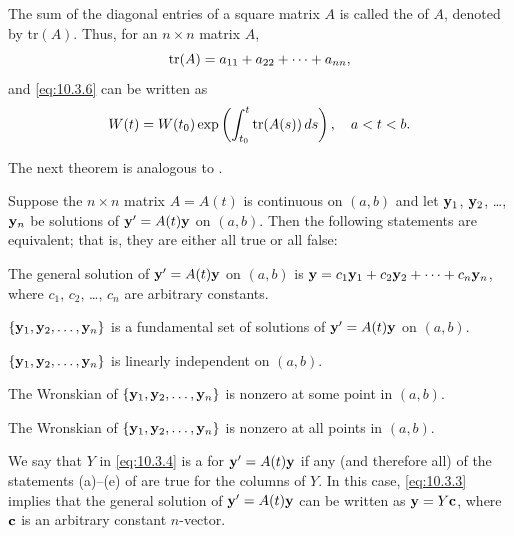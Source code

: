 \begin{remark*}
The sum of the diagonal entries of a square matrix $A$ is called the
 of $A$, denoted by tr$(A)$. Thus, for an $n\times n$
matrix $A$,
\[
\operatorname{tr}(A)=a_{11}+a_{22}+\cdots+a_{nn},
\]
and  \eqref{eq:10.3.6} can be written as
\[
W(t)=W(t_0)\exp\left(
\int^t_{t_0}\operatorname{tr}(A(s))\,
ds\right), \quad a < t < b.
\]
\end{remark*}

The next theorem is analogous to
.

\begin{theorem}\label{thmtype:10.3.3}
Suppose the  $n\times n$ matrix $A=A(t)$ is continuous
 on $(a,b)$ and let
$\mathbf{y}_1$, $\mathbf{y}_2$, \dots, $\mathbf{y}_n$
be  solutions of $\mathbf{y}'=A(t)\mathbf{y}$ on  $(a,b)$.
 Then the following statements are equivalent; that is, they are
either all true or all false:
\begin{alist}
\item %
The general
solution
of $\mathbf{y}'=A(t)\mathbf{y}$ on  $(a,b)$ is
$\mathbf{y}=c_1\mathbf{y}_1+c_2\mathbf{y}_2+\cdots+c_n\mathbf{y}_n$,
where $c_1$, $c_2$, \dots, $c_n$  are arbitrary constants.
\item %
$\{\mathbf{y}_1,\mathbf{y}_2,\dots,\mathbf{y}_n\}$ is a fundamental set of
solutions
of $\mathbf{y}'=A(t)\mathbf{y}$  on $(a,b)$.
\item %
 $\{\mathbf{y}_1,\mathbf{y}_2,\dots,\mathbf{y}_n\}$ is linearly
independent
on $(a,b)$.
\item %
The Wronskian of  $\{\mathbf{y}_1,\mathbf{y}_2,\dots,\mathbf{y}_n\}$ is nonzero
at some point in $(a,b)$.
\item %
The Wronskian of  $\{\mathbf{y}_1,\mathbf{y}_2,\dots,\mathbf{y}_n\}$ is nonzero
at all points in $(a,b)$.
\end{alist}
\end{theorem}


We say that $Y$ in \eqref{eq:10.3.4} is a  for
$\mathbf{y}'=A(t)\mathbf{y}$ if any (and therefore all) of the statements
(a)--(e) of  are true for the
columns of $Y$. In this case, \eqref{eq:10.3.3} implies that the general
solution of $\mathbf{y}'=A(t)\mathbf{y}$ can be written as $\mathbf{y}=Y\mathbf{c}$, where $\mathbf{c}$ is an arbitrary constant $n$-vector.

